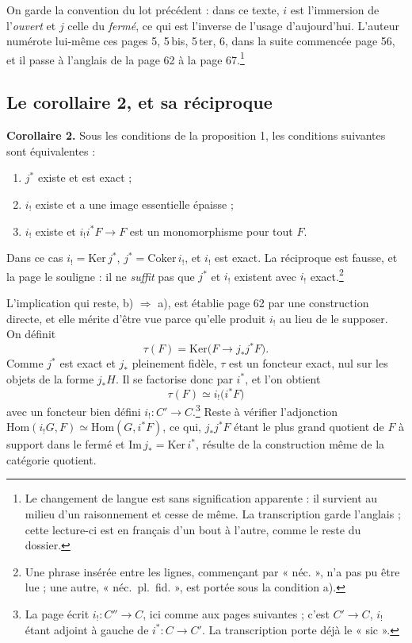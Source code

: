 \documentclass[11pt,a4paper]{article}
\begin{document}
On garde la convention du lot précédent : dans ce texte, $i$ est l'immersion de
l'\emph{ouvert} et $j$ celle du \emph{fermé}, ce qui est l'inverse de l'usage
d'aujourd'hui. L'auteur numérote lui-même ces pages 5, 5\,bis, 5\,ter, 6, dans
la suite commencée page 56, et il passe à l'anglais de la page 62 à la page
67.\footnote{Le changement de langue est sans signification apparente : il
survient au milieu d'un raisonnement et cesse de même. La transcription garde
l'anglais ; cette lecture-ci est en français d'un bout à l'autre, comme le
reste du dossier.}

\subsection*{Le corollaire 2, et sa réciproque}

\textbf{Corollaire 2.} Sous les conditions de la proposition 1, les conditions
suivantes sont équivalentes :

\begin{enumerate}
\item[a)] $j^{*}$ existe et est exact ;
\item[b)] $i_{!}$ existe et a une image essentielle épaisse ;
\item[b$'$)] $i_{!}$ existe et $i_{!}i^{*}F \to F$ est un monomorphisme pour
tout $F$.
\end{enumerate}

Dans ce cas $i_{!} = \mathrm{Ker}\,j^{*}$, $j^{*} = \mathrm{Coker}\,i_{!}$, et
$i_{!}$ est exact. La réciproque est fausse, et la page le souligne : il ne
\emph{suffit} pas que $j^{*}$ et $i_{!}$ existent avec $i_{!}$
exact.\footnote{Une phrase insérée entre les lignes, commençant par « néc. »,
n'a pas pu être lue ; une autre, « néc.\ pl.\ fid. », est portée sous la
condition a).}

L'implication qui reste, b) $\Rightarrow$ a), est établie page 62 par une
construction directe, et elle mérite d'être vue parce qu'elle produit $i_{!}$
au lieu de le supposer. On définit
\[
  \tau(F) = \mathrm{Ker}\bigl( F \longrightarrow j_{*}j^{*}F \bigr) .
\]
Comme $j^{*}$ est exact et $j_{*}$ pleinement fidèle, $\tau$ est un foncteur
exact, nul sur les objets de la forme $j_{*}H$. Il se factorise donc par
$i^{*}$, et l'on obtient
\[
  \tau(F) \simeq i_{!}\bigl( i^{*}F \bigr)
\]
avec un foncteur bien défini $i_{!} : C' \to C$.\footnote{La page écrit
$i_{!} : C'' \to C$, ici comme aux pages suivantes ; c'est $C' \to C$, $i_{!}$
étant adjoint à gauche de $i^{*} : C \to C'$. La transcription porte déjà le
« sic ».} Reste à vérifier l'adjonction $\mathrm{Hom}(i_{!}G, F) \simeq
\mathrm{Hom}(G, i^{*}F)$, ce qui, $j_{*}j^{*}F$ étant le plus grand quotient de
$F$ à support dans le fermé et $\mathrm{Im}\,j_{*} = \mathrm{Ker}\,i^{*}$,
résulte de la construction même de la catégorie quotient.
\end{document}
